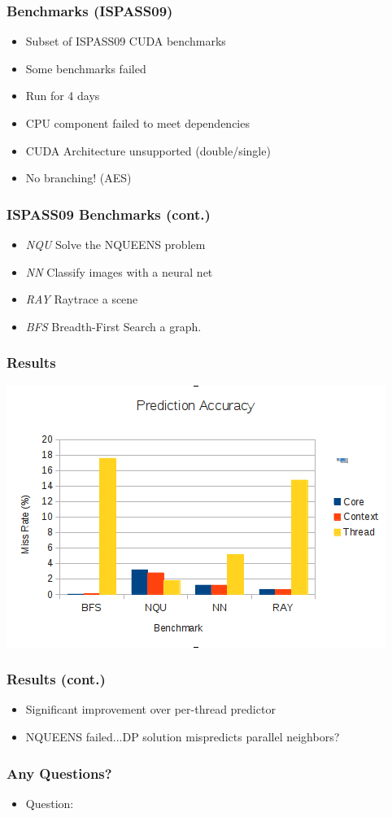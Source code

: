 \documentclass{beamer}
\begin{document}
\begin{frame}
 \frametitle{Benchmarks (ISPASS09)}
 \begin{itemize}
  \item Subset of ISPASS09 CUDA benchmarks
  \item Some benchmarks failed
  \item Run for 4 days
  \item CPU component failed to meet dependencies
  \item CUDA Architecture unsupported (double/single)
  \item No branching!  (AES)
 \end{itemize}
\end{frame}

\begin{frame}
 \frametitle{ISPASS09 Benchmarks (cont.)}
\begin{itemize}
 \item \emph{NQU} Solve the NQUEENS problem
 \item \emph{NN} Classify images with a neural net
  \item \emph{RAY} Raytrace a scene
\item \emph{BFS} Breadth-First Search a graph.
\end{itemize}
\end{frame}

\begin{frame}
\frametitle{Results}
\includegraphics[width=.9\textwidth]{data.png}
\end{frame}

\begin{frame}
 \frametitle{Results (cont.)}
\begin{itemize}
 \item Significant improvement over per-thread predictor
 \item NQUEENS failed...DP solution mispredicts parallel neighbors?
\end{itemize}

\end{frame}

\begin{frame}
 \frametitle{Any Questions?}
\begin{itemize}
 \item Question: 
\end{itemize}

\end{frame}
\end{document}
